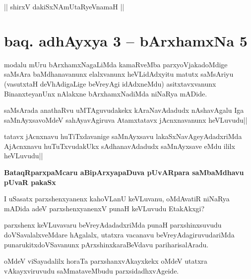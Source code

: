 \begin{center}
|| shirxV dakiSxNAmUtaRyeVnamaH ||
\end{center}

\section*{baq. adhAyxya 3 -- bArxhamxNa 5}

\begin{artha}%
modalu mUru bArxhamxNagaLiMda kamaRveMba parxyoVjakadoMdige saMsAra baMdhanavanunx elalxvanunx heVLidAdxyitu matutx saMsAriyu (vasutxtaH deVhAdigaLige beVreyAgi idAdxneMdu) asitxtavxvanunx BinanxteyanUnx nAlakxne bArxhamxNadiMda niNaRya mADide.
\end{artha}


\begin{artha}
saMsArada anathaRvu uMTAguvudakekx kAraNavAdadudx nAshavAgalu Iga saMnAyxsavoMdeV sahAyavAgiruva Atamxtatavx jAcnxnavanunx heVLuvudu||
\end{artha}


\begin{artha}
tatavx jAcnxnavu huTiTxdavanige saMnAyxsavu lakaSxNavAgeyAdadxriMda AjAcnxnavu huTuTxvudakUkx sAdhanavAdadudx saMnAyxsave eMdu ililx heVLuvudu||
\end{artha}


\begin{artha}%
\textbf{BataqRparxpaMcaru aBipArxyapaDuva pUvARpara saMbaMdhavu pUvaR pakaSx}
\end{artha}

\begin{artha}
I uSasatx parxshenxyanenx kahoVLanU keVLuvanu, oMdAvatiR niNaRya mADida adeV parxshenxyanenxV punaH keVLuvudu EtakAkxgi?
\end{artha}

\begin{artha}
parxshenx keVLuvavaru beVreyAdadadxriMda punaH parxshinxsuvudu doVSavalalxveMdare hAgalalx, utatxra vacanavu beVreyAdagiruvudariMda punarukitxdoVSavanunx pArxshinxkaraBeVdavu pariharisalAradu.

oMdeV viSayadalilx horaTa parxshanxvAkayxkekx oMdeV utatxra vAkayxviruvudu saMmataveMbudu parxsidadhxvAgeide. 
\end{artha}

